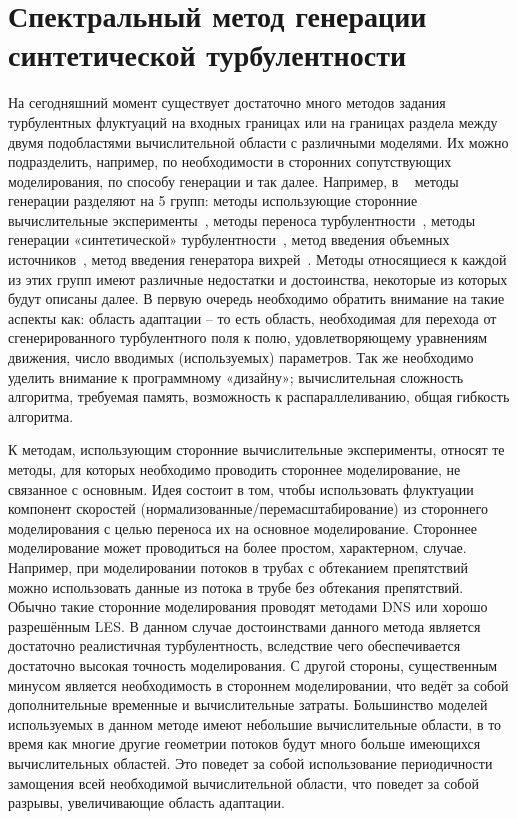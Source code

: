 \chapter{Спектральный метод генерации синтетической турбулентности} \label{chapt2}

На сегодняшний момент существует достаточно много методов задания турбулентных флуктуаций на входных границах или на границах раздела между двумя подобластями вычислительной области с различными моделями. Их можно подразделить, например, по необходимости в сторонних сопутствующих моделирования, по способу генерации и так далее. Например, в ~\cite{shur2014synthetic} методы генерации разделяют на 5 групп: методы использующие сторонние вычислительные эксперименты~\cite{schluter2004large}, методы переноса турбулентности~\cite{lund1998generation,spalart2006direct,shur2011rapid,araya2011dynamic}, методы генерации «синтетической» турбулентности~\cite{Kraichnan70,Smirnov2001,huang2010general,shur2014synthetic,adamian2011efficient,batten2004interfacing}, метод введения объемных источников~\cite{gritskevich2012embedded,spille2001generation}, метод введения генератора вихрей~\cite{terracol2016investigation}. Методы относящиеся к каждой из этих групп имеют различные недостатки и достоинства, некоторые из которых будут описаны далее. В первую очередь необходимо обратить внимание на такие аспекты как: область адаптации – то есть область, необходимая для перехода от сгенерированного турбулентного поля к полю, удовлетворяющему уравнениям движения, число вводимых (используемых) параметров. Так же необходимо уделить внимание к программному «дизайну»; вычислительная сложность алгоритма, требуемая память, возможность к распараллеливанию, общая гибкость алгоритма. 

К методам, использующим сторонние вычислительные эксперименты, относят те методы, для которых необходимо проводить стороннее моделирование, не связанное с основным. Идея состоит в том, чтобы использовать флуктуации компонент скоростей (нормализованные/перемасштабирование) из стороннего моделирования с целью переноса их на основное моделирование. Стороннее моделирование может проводиться на более простом, характерном, случае. Например, при моделировании потоков в трубах с обтеканием препятствий можно использовать данные из потока в трубе без обтекания препятствий. Обычно такие сторонние моделирования проводят методами DNS или хорошо разрешённым LES. В данном случае достоинствами данного метода является достаточно реалистичная турбулентность, вследствие чего обеспечивается достаточно высокая точность моделирования. С другой стороны, существенным минусом является необходимость в стороннем моделировании, что ведёт за собой дополнительные временные и вычислительные затраты. Большинство моделей используемых в данном методе имеют небольшие вычислительные области, в то время как многие другие геометрии потоков будут много больше имеющихся вычислительных областей. Это поведет за собой использование периодичности замощения всей необходимой вычислительной области, что поведет за собой разрывы, увеличивающие область адаптации. 

